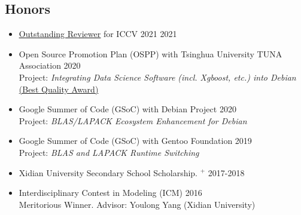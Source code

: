 \documentclass[10pt,margin,line,pifont,palatino,courier]{res}
\begin{document}
\begin{resume}
%
%
%

\section{\sc Honors}

\begin{itemize}[leftmargin=*]
	\item \href{http://iccv2021.thecvf.com/outstanding-reviewers}{\underline{Outstanding Reviewer}} for ICCV 2021 \hfill 2021
	\item Open Source Promotion Plan (OSPP) with Tsinghua University TUNA Association \hfill 2020\\
		Project: \textit{Integrating Data Science Software (incl. Xgboost, etc.) into Debian}\\
		\href{https://isrc.iscas.ac.cn/summer2020/#/announcement}{(Best Quality Award)}
	\item Google Summer of Code (GSoC) with Debian Project \hfill 2020\\
		Project: \textit{BLAS/LAPACK Ecosystem Enhancement for Debian}
	\item Google Summer of Code (GSoC) with Gentoo Foundation \hfill 2019\\
		Project: \textit{BLAS and LAPACK Runtime Switching}
	\item Xidian University Secondary School Scholarship.%
		\href{http://see.xidian.edu.cn/html/news/9732.html}{$^+$} \hfill 2017-2018
	\item Interdisciplinary Contest in Modeling (ICM) \hfill 2016\\
		Meritorious Winner. Advisor: Youlong Yang (Xidian University)
\end{itemize}



\end{resume}
\end{document}
